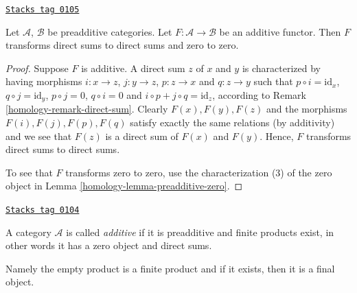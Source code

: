 \begin{lemma}
\label{homology-lemma-additive-additive}
\href{https://stacks.math.columbia.edu/tag/0105}{\texttt{Stacks tag 0105}}

Let $\mathcal{A}$, $\mathcal{B}$ be preadditive categories.
Let $F : \mathcal{A} \to \mathcal{B}$ be an additive functor.
Then $F$ transforms direct sums to direct sums and zero to zero.
\end{lemma}

\begin{proof}

Suppose $F$ is additive. A direct sum $z$
of $x$ and $y$ is characterized by having morphisms
$i : x \to z$, $j : y \to z$, $p : z \to x$ and
$q : z \to y$ such that $p \circ i = \text{id}_x$,
$q \circ j = \text{id}_y$, $p \circ j = 0$, $q \circ i = 0$
and $i \circ p + j \circ q = \text{id}_z$, according
to Remark \ref{homology-remark-direct-sum}. Clearly $F(x), F(y), F(z)$
and the morphisms $F(i), F(j), F(p), F(q)$ satisfy exactly the
same relations (by additivity) and we see that $F(z)$ is
a direct sum of $F(x)$ and $F(y)$.
Hence, $F$ transforms direct sums to direct sums.

\medskip\noindent
To see that $F$ transforms zero to zero, use the
characterization (3) of the zero object in
Lemma \ref{homology-lemma-preadditive-zero}.
\end{proof}

\begin{definition}
\label{homology-definition-additive-category}
\href{https://stacks.math.columbia.edu/tag/0104}{\texttt{Stacks tag 0104}}

A category $\mathcal{A}$ is called {\it additive}
if it is preadditive and finite products exist, in other
words it has a zero object and direct sums.
\end{definition}

Namely the empty product is a finite product and
if it exists, then it is a final object.

